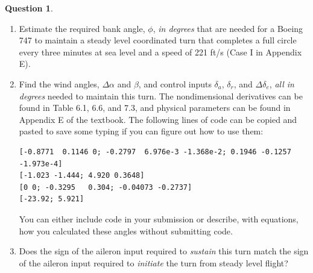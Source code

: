 \documentclass{article}
\newcommand{\comment}[1]{\textcolor{blue}{[Comment: #1]}}
\theoremstyle{definition}
\newtheorem{question}{Question}
\begin{document}
\begin{question}
\begin{enumerate} \-\
    \item Estimate the required bank angle, $\phi$, \emph{in degrees} that are needed for a Boeing 747 to maintain a steady level coordinated turn that completes a full circle every three minutes at sea level and a speed of 221 ft/s (Case I in Appendix E).
    
    
    \item Find the wind angles, $\Delta \alpha$ and $\beta$, and control inputs $\delta_a$, $\delta_r$, and $\Delta \delta_e$, \emph{all in degrees} needed to maintain this turn. The nondimensional derivatives can be found in Table 6.1, 6.6, and 7.3, and physical parameters can be found in Appendix E of the textbook. The following lines of code can be copied and pasted to save some typing if you can figure out how to use them:

\begin{verbatim}
[-0.8771  0.1146 0; -0.2797  6.976e-3 -1.368e-2; 0.1946 -0.1257 -1.973e-4]
[-1.023 -1.444; 4.920 0.3648]
[0 0; -0.3295   0.304; -0.04073 -0.2737]
[-23.92; 5.921]
\end{verbatim}
    
    You can either include code in your submission or describe, with equations, how you calculated these angles without submitting code.

    \item Does the sign of the aileron input required to \emph{sustain} this turn match the sign of the aileron input required to \emph{initiate} the turn from steady level flight?
\end{enumerate}

\end{question}
\vspace{0.1cm}
\clearpage

\vspace{6cm}
\end{document}
